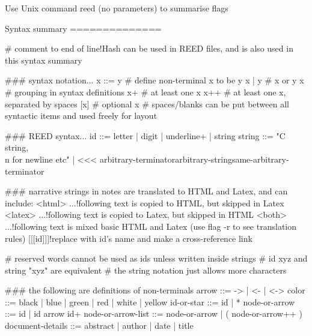 Use Unix command reed (no parameters) to summarise flags

Syntax summary
==============

# comment to end of line!Hash can be used in REED files, and is also used in this syntax summary

### syntax notation...
x ::= y # define non-terminal x to be y
x | y   # x or y
{x}     # grouping in syntax definitions
x+      # at least one x
x++     # at least one x, separated by spaces
[x]     # optional x
        # spaces/blanks can be put between all syntactic items and used freely for layout 

### REED syntax...
id ::= {letter | digit | underline}+ | string
string ::= "C string, \\n for newline etc" | <<< arbitrary-terminator\n                                                        arbitrary-string\n                                                     same-arbitrary-terminator

### narrative strings in notes are translated to HTML and Latex, and can include:
<html> ...!following text is copied to HTML, but skipped in Latex
<latex> ...!following text is copied to Latex, but skipped in HTML
<both> ...!following text is mixed basic HTML and Latex (use flag -r to see translation rules)
[[[id]]]!replace with id's name and make a cross-reference link

# reserved words cannot be used as ids unless written inside strings
# id xyz and string "xyz" are equivalent
# the string notation just allows more characters

### the following are definitions of non-terminals
arrow ::= -> | <- | <->
color ::= black | blue | green | red | white | yellow
id-or-star ::= id | *
node-or-arrow ::= id | id {arrow id}+
node-or-arrow-list ::= node-or-arrow | ( node-or-arrow++ )
document-details ::= abstract | author | date | title

